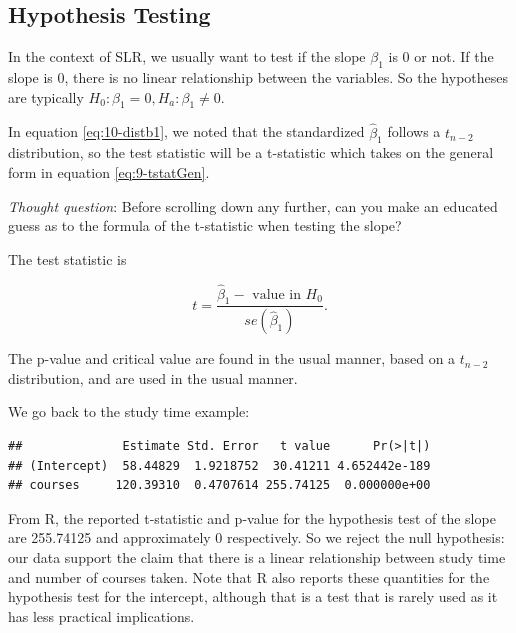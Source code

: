 \documentclass[
]{book}
\newenvironment{Shaded}{\begin{snugshade}}{\end{snugshade}}
\newcommand{\DocumentationTok}[1]{\textcolor[rgb]{0.56,0.35,0.01}{\textbf{\textit{#1}}}}
\newcommand{\FunctionTok}[1]{\textcolor[rgb]{0.13,0.29,0.53}{\textbf{#1}}}
\newcommand{\NormalTok}[1]{#1}
\newcommand{\SpecialCharTok}[1]{\textcolor[rgb]{0.81,0.36,0.00}{\textbf{#1}}}
\begin{document}
\hypertarget{hypothesis-testing-1}{%
\subsection{Hypothesis Testing}\label{hypothesis-testing-1}}

In the context of SLR, we usually want to test if the slope \(\beta_1\) is 0 or not. If the slope is 0, there is no linear relationship between the variables. So the hypotheses are typically \(H_0: \beta_1 = 0, H_a: \beta_1 \neq 0.\)

In equation \eqref{eq:10-distb1}, we noted that the standardized \(\hat{\beta}_1\) follows a \(t_{n-2}\) distribution, so the test statistic will be a t-statistic which takes on the general form in equation \eqref{eq:9-tstatGen}.

\emph{Thought question}: Before scrolling down any further, can you make an educated guess as to the formula of the t-statistic when testing the slope?

The test statistic is

\begin{equation} 
t = \frac{\hat{\beta}_1 - \text{ value in } H_0}{se(\hat{\beta}_1)}.
\label{eq:10-testslope}
\end{equation}

The p-value and critical value are found in the usual manner, based on a \(t_{n-2}\) distribution, and are used in the usual manner.

We go back to the study time example:

\begin{Shaded}
\end{Shaded}

\begin{verbatim}
##              Estimate Std. Error   t value      Pr(>|t|)
## (Intercept)  58.44829  1.9218752  30.41211 4.652442e-189
## courses     120.39310  0.4707614 255.74125  0.000000e+00
\end{verbatim}

From R, the reported t-statistic and p-value for the hypothesis test of the slope are 255.74125 and approximately 0 respectively. So we reject the null hypothesis: our data support the claim that there is a linear relationship between study time and number of courses taken. Note that R also reports these quantities for the hypothesis test for the intercept, although that is a test that is rarely used as it has less practical implications.
\end{document}
